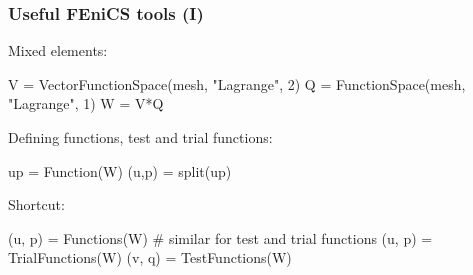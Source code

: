\begin{frame}[fragile]
  \frametitle{Useful FEniCS tools (I)}
  Mixed elements:
  \vspace{-0.5cm}
  \begin{python}
V = VectorFunctionSpace(mesh, "Lagrange", 2)
Q = FunctionSpace(mesh, "Lagrange", 1)
W = V*Q
  \end{python}
 Defining functions, test and trial functions:
  \vspace{-0.5cm}
 \begin{python}
up = Function(W)
(u,p) = split(up)
 \end{python}
 Shortcut:
  \vspace{-0.5cm}
 \begin{python}
(u, p) = Functions(W)
# similar for test and trial functions
(u, p) = TrialFunctions(W)
(v, q) = TestFunctions(W)
 \end{python}
\end{frame}
